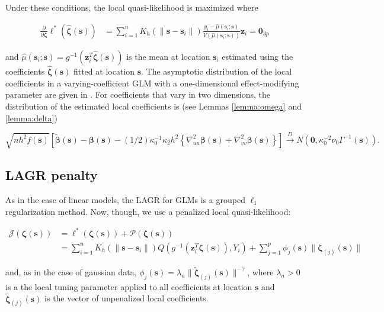 \documentclass[authoryear,review, 12pt]{elsarticle}
\begin{document}
Under these conditions, the local quasi-likelihood is maximized where

\begin{align}
\frac{\partial}{\partial\bm{\zeta}}\mathcal{\ell}^{*}\left(\hat{\bm{\zeta}}\left(\bm{s}\right)\right) & =\sum_{i=1}^{n}K_{h}\left(\|\bm{s}-\bm{s}_{i}\|\right)\frac{y_{i}-\hat{\mu}\left(\bm{s}_{i};\bm{s}\right)}{V\left(\hat{\mu}\left(\bm{s}_{i};\bm{s}\right)\right)}\bm{z}_{i}=\bm{0}_{3p}
\end{align}


and $\hat{\mu}\left(\bm{s}_{i};\bm{s}\right)=g^{-1}\left(\bm{z}_{i}^{T}\hat{\bm{\zeta}}\left(\bm{s}\right)\right)$
is the mean at location $\bm{s}_{i}$ estimated using the coefficients
$\hat{\bm{\zeta}}\left(\bm{s}\right)$ fitted at location $\bm{s}$.
The asymptotic distribution of the local coefficients in a varying-coefficient
GLM with a one-dimensional effect-modifying parameter are given in
\citet{Cai-Fan-Li-2000}. For coefficients that vary in two dimensions,
the distribution of the estimated local coefficients is (see Lemmas
\ref{lemma:omega} and \ref{lemma:delta})

\[
\sqrt{{nh^{2}f(\bm{{s}})}}\left[\tilde{\bm{\beta}}(\bm{s})-\bm{\beta}(\bm{s})-(1/2)\kappa_{0}^{-1}\kappa_{2}h^{2}\left\{ \nabla_{uu}^{2}\bm{\beta}(\bm{s})+\nabla_{vv}^{2}\bm{\beta}(\bm{s})\right\} \right]\xrightarrow{{D}}N\left(\bm{0},\kappa_{0}^{-2}\nu_{0}\Gamma^{-1}(\bm{s})\right).
\]



\subsection{LAGR penalty}

As in the case of linear models, the LAGR for GLMs is a grouped $\ell_{1}$
regularization method. Now, though, we use a penalized local quasi-likelihood:

\begin{align}
\mathcal{J}\left(\bm{\zeta}(\bm{s})\right) & =\mathcal{\ell}^{*}\left(\bm{\zeta}(\bm{s})\right)+\mathcal{P}\left(\bm{\zeta}(\bm{s})\right)\label{eq:adaptive-lasso-GLLM}\\
 & =\sum_{i=1}^{n}K_{h}\left(\|\bm{s}-\bm{s}_{i}\|\right)Q\left(g^{-1}\left(\bm{z}_{i}^{T}\bm{\zeta}(\bm{s})\right),Y_{i}\right)+\sum_{j=1}^{p}\phi_{j}\left(\bm{s}\right)\|\bm{\zeta}_{\left(j\right)}\left(\bm{s}\right)\|
\end{align}


and, as in the case of gaussian data, $\phi_{j}\left(\bm{s}\right)=\lambda_{n}\|\tilde{\bm{\zeta}}_{\left(j\right)}\left(\bm{s}\right)\|^{-\gamma}$,
where $\lambda_{n}>0$ is a the local tuning parameter applied to
all coefficients at location $\bm{s}$ and $\tilde{\bm{\zeta}}_{\left(j\right)}\left(\bm{s}\right)$
is the vector of unpenalized local coefficients.
\end{document}
